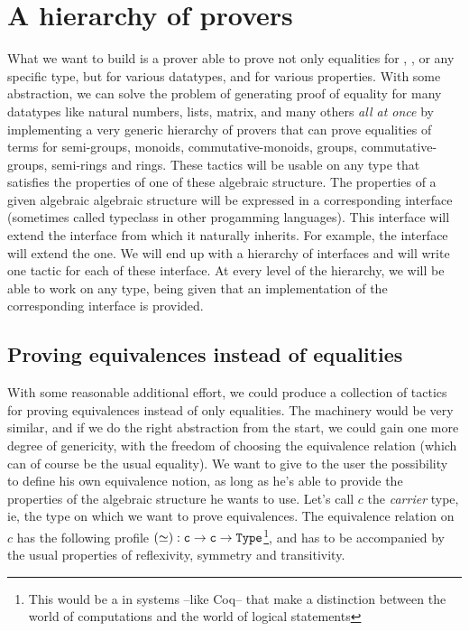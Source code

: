 \section{A hierarchy of provers}

What we want to build is a prover able to prove not only equalities for , , or any specific type, but for various datatypes, and for various properties. With some abstraction, we can solve the problem of generating proof of equality for many datatypes like natural numbers, lists, matrix, and many others \emph{all at once} by implementing a very generic hierarchy of provers that can prove equalities of terms for semi-groups, monoids, commutative-monoids, groups, commutative-groups, semi-rings and rings. These tactics will be usable on any type that satisfies the properties of one of these algebraic structure. The properties of a given algebraic algebraic structure will be expressed in a corresponding interface (sometimes called typeclass in other progamming languages). This interface will extend the interface from which it naturally inherits. For example, the  interface will extend the  one. We will end up with a hierarchy of interfaces and will write one tactic for each of these interface. At every level of the hierarchy, we will be able to work on any type, being given that an implementation of the corresponding interface is provided.

	\subsection{Proving equivalences instead of equalities}
	
With some reasonable additional effort, we could produce a collection of tactics for proving equivalences instead of only equalities. The machinery would be very similar, and if we do the right abstraction from the start, we could gain one more degree of genericity, with the freedom of choosing the equivalence relation (which can of course be the usual equality). We want to give to the user the possibility to define his own equivalence notion, as long as he's able to provide the properties of the algebraic structure he wants to use. Let's call $c$ the \emph{carrier} type, ie, the type on which we want to prove equivalences. The equivalence relation on $c$ has the following profile $(\simeq) : {\mbox{\texttt{c}}} \rightarrow {\mbox{\texttt{c}}} \rightarrow {\mbox{\texttt{Type}}}$\footnote{This  would be a  in systems --like Coq-- that make a distinction between the world of computations and the world of logical statements}, and has to be accompanied by the usual properties of reflexivity, symmetry and transitivity.

